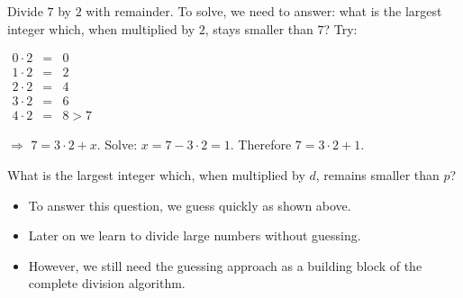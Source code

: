 \begin{frame}
\vskip -0.1cm
\begin{example}
Divide $7$ by $2$ with remainder. To solve, we need to answer: what is the largest integer which, when multiplied by $2$, stays smaller than $7$? Try:

\hfil\hfil $
\begin{array}{rcl}
0\cdot 2&=& 0\\
1\cdot 2&=& 2\\
2\cdot 2&=& 4\\
3\cdot 2&=& 6\\
4\cdot 2&=& 8>7
\end{array}
$

$\Rightarrow$ $7= 3\cdot 2 +x$. Solve: $x=7-3\cdot 2= 1$. Therefore $7= 3\cdot 2 +1$.

\end{example}


\vskip -0.1cm
\begin{observation}

What is the largest integer which, when multiplied by $d$, remains smaller than $p$?
\end{observation}

\vskip -0.1cm
\begin{itemize}
\item To answer this question, we guess quickly as shown above.
\item Later on we learn to divide large numbers without guessing.
\item However, we still need the guessing approach as a building block of the complete division algorithm.
\end{itemize}
\end{frame}